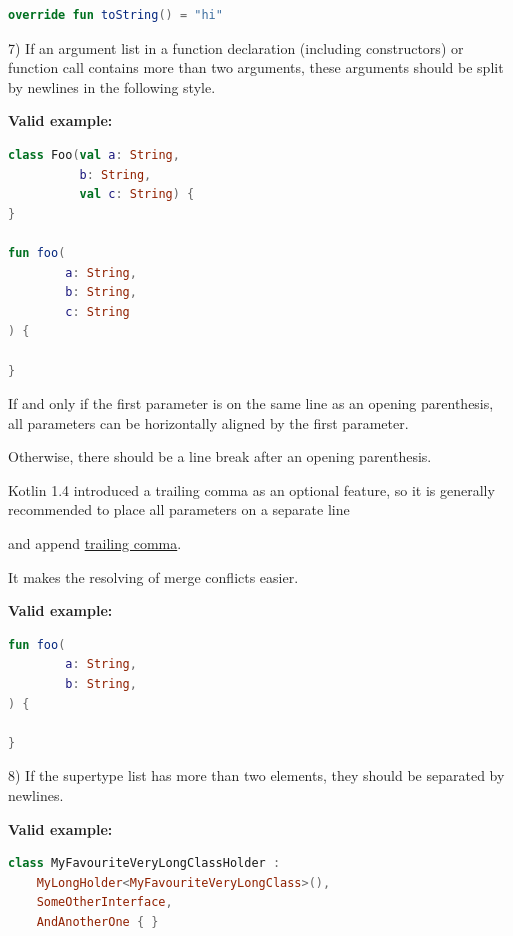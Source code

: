 {{\begin{lstlisting}[language=Kotlin]
override fun toString() = "hi"
\end{lstlisting}


7)  If an argument list in a function declaration (including constructors) or function call contains more than two arguments, these arguments should be split by newlines in the following style.



\textbf{Valid example:} 

\begin{lstlisting}[language=Kotlin]
class Foo(val a: String,
          b: String,
          val c: String) {
}

fun foo(
        a: String,
        b: String,
        c: String
) {

}
\end{lstlisting}


If and only if the first parameter is on the same line as an opening parenthesis, all parameters can be horizontally aligned by the first parameter.

Otherwise, there should be a line break after an opening parenthesis.



Kotlin 1.4 introduced a trailing comma as an optional feature, so it is generally recommended to place all parameters on a separate line

and append \href{https://kotlinlang.org/docs/reference/whatsnew14.html#trailing-comma}{trailing comma}.

It makes the resolving of merge conflicts easier.



\textbf{Valid example:} 

\begin{lstlisting}[language=Kotlin]
fun foo(
        a: String,
        b: String,
) {

}
\end{lstlisting}


8) If the supertype list has more than two elements, they should be separated by newlines.



\textbf{Valid example:} 

\begin{lstlisting}[language=Kotlin]
class MyFavouriteVeryLongClassHolder :
    MyLongHolder<MyFavouriteVeryLongClass>(),
    SomeOtherInterface,
    AndAnotherOne { }
\end{lstlisting}


}}
